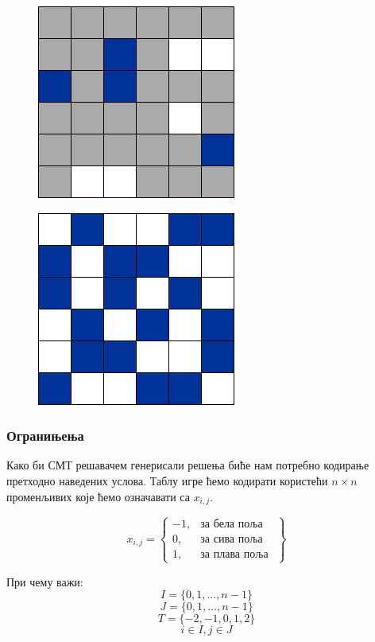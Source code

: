 \documentclass[a4paper]{article}
\begin{document}
\begin{figure}
\centering
\begin{minipage}{.5\textwidth}
	\centering
	\includegraphics[width=.4\linewidth]{./slike/three_way_original.png}
	\label{fig:threeway_original}
\end{minipage}%
\begin{minipage}{.5\textwidth}
  \centering
  \includegraphics[width=.4\linewidth]{./slike/three_way_solved.png}
  \label{fig:threeway_solved}
\end{minipage}
\end{figure}

\subsubsection{Огранињења}
Како би СМТ решавачем генерисали решења биће нам потребно кодирање претходно наведених услова. Таблу игре
ћемо кодирати користећи $n \times n$ променљивих које ћемо означавати са $x_{i, j}$.


\[
    x_{i, j} = \left\{\begin{array}{lr}
        -1, & \text{за бела поља} \\
        0, & \text{за сива поља } \\
        1, & \text{за плава поља } 
    \end{array}\right\}
\]

При чему важи:
$$ I = \{0, 1, ..., n-1\} $$
$$ J = \{0, 1, ..., n-1\} $$
$$ T = \{-2, -1, 0, 1, 2\} $$
$$ i \in I, j \in J $$
\end{document}

